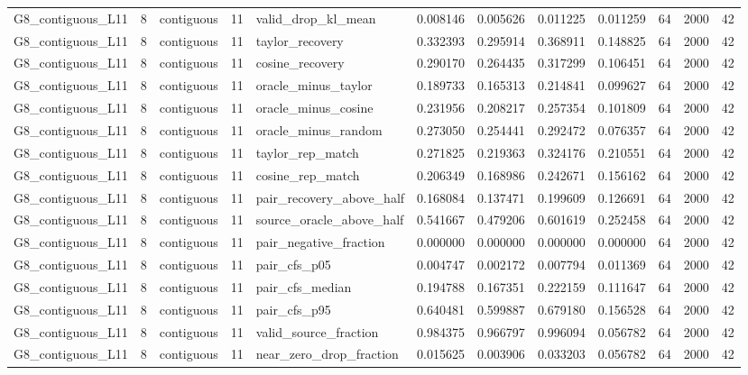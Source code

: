 \begin{tabular}{lrlrlrrrrrrr}
G8_contiguous_L11 & 8 & contiguous & 11 & valid_drop_kl_mean & 0.008146 & 0.005626 & 0.011225 & 0.011259 & 64 & 2000 & 42 \\
G8_contiguous_L11 & 8 & contiguous & 11 & taylor_recovery & 0.332393 & 0.295914 & 0.368911 & 0.148825 & 64 & 2000 & 42 \\
G8_contiguous_L11 & 8 & contiguous & 11 & cosine_recovery & 0.290170 & 0.264435 & 0.317299 & 0.106451 & 64 & 2000 & 42 \\
G8_contiguous_L11 & 8 & contiguous & 11 & oracle_minus_taylor & 0.189733 & 0.165313 & 0.214841 & 0.099627 & 64 & 2000 & 42 \\
G8_contiguous_L11 & 8 & contiguous & 11 & oracle_minus_cosine & 0.231956 & 0.208217 & 0.257354 & 0.101809 & 64 & 2000 & 42 \\
G8_contiguous_L11 & 8 & contiguous & 11 & oracle_minus_random & 0.273050 & 0.254441 & 0.292472 & 0.076357 & 64 & 2000 & 42 \\
G8_contiguous_L11 & 8 & contiguous & 11 & taylor_rep_match & 0.271825 & 0.219363 & 0.324176 & 0.210551 & 64 & 2000 & 42 \\
G8_contiguous_L11 & 8 & contiguous & 11 & cosine_rep_match & 0.206349 & 0.168986 & 0.242671 & 0.156162 & 64 & 2000 & 42 \\
G8_contiguous_L11 & 8 & contiguous & 11 & pair_recovery_above_half & 0.168084 & 0.137471 & 0.199609 & 0.126691 & 64 & 2000 & 42 \\
G8_contiguous_L11 & 8 & contiguous & 11 & source_oracle_above_half & 0.541667 & 0.479206 & 0.601619 & 0.252458 & 64 & 2000 & 42 \\
G8_contiguous_L11 & 8 & contiguous & 11 & pair_negative_fraction & 0.000000 & 0.000000 & 0.000000 & 0.000000 & 64 & 2000 & 42 \\
G8_contiguous_L11 & 8 & contiguous & 11 & pair_cfs_p05 & 0.004747 & 0.002172 & 0.007794 & 0.011369 & 64 & 2000 & 42 \\
G8_contiguous_L11 & 8 & contiguous & 11 & pair_cfs_median & 0.194788 & 0.167351 & 0.222159 & 0.111647 & 64 & 2000 & 42 \\
G8_contiguous_L11 & 8 & contiguous & 11 & pair_cfs_p95 & 0.640481 & 0.599887 & 0.679180 & 0.156528 & 64 & 2000 & 42 \\
G8_contiguous_L11 & 8 & contiguous & 11 & valid_source_fraction & 0.984375 & 0.966797 & 0.996094 & 0.056782 & 64 & 2000 & 42 \\
G8_contiguous_L11 & 8 & contiguous & 11 & near_zero_drop_fraction & 0.015625 & 0.003906 & 0.033203 & 0.056782 & 64 & 2000 & 42 \\

\end{tabular}
